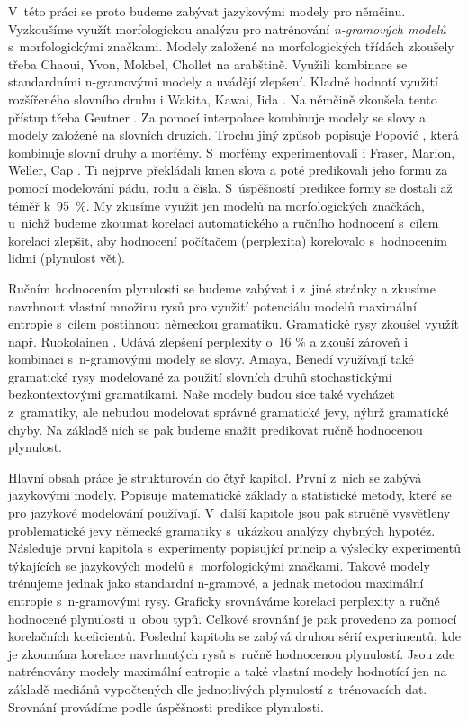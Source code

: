 \documentclass[12pt,a4paper]{report}
\begin{document}
V~této práci se proto budeme zabývat jazykovými modely pro němčinu. Vyzkoušíme využít morfologickou analýzu pro natrénování \textit{n-gramových modelů} s~morfologickými značkami. Modely založené na morfologických třídách zkoušely třeba Chaoui, Yvon, Mokbel, Chollet \cite{ghaoui} na arabštině. Využili kombinace se standardními n-gramovými modely a uvádějí zlepšení. Kladně hodnotí využití rozšířeného slovního druhu i Wakita, Kawai, Iida \cite{wakita}. Na němčině zkoušela tento přístup třeba Geutner \cite{geutner}. Za pomocí interpolace kombinuje modely se slovy a modely založené na slovních druzích. Trochu jiný způsob popisuje Popović \cite{popovic}, která kombinuje slovní druhy a morfémy. S~morfémy experimentovali i Fraser, Marion, Weller, Cap \cite{fraser12}. Ti nejprve překládali kmen slova a poté predikovali jeho formu za pomocí modelování pádu, rodu a čísla. S~úspěšností predikce formy se dostali až téměř k~95~\%. My zkusíme využít jen modelů na morfologických značkách, u~nichž budeme zkoumat korelaci automatického a ručního hodnocení s~cílem korelaci zlepšit, aby hodnocení počítačem (perplexita) korelovalo s~hodnocením lidmi (plynulost vět).

Ručním hodnocením plynulosti se budeme zabývat i z~jiné stránky a zkusíme navrhnout vlastní množinu rysů pro využití potenciálu modelů maximální entropie s~cílem postihnout německou gramatiku. Gramatické rysy zkoušel využít např. Ruokolainen \cite{ruokolainen}. Udává zlepšení perplexity o~16 \% a zkouší zároveň i kombinaci s~n-gramovými modely se slovy. Amaya, Benedí \cite{amaya} využívají také gramatické rysy modelované za použití slovních druhů stochastickými bezkontextovými gramatikami. Naše modely budou sice také vycházet z~gramatiky, ale nebudou modelovat správné gramatické jevy, nýbrž gramatické chyby. Na základě nich se pak budeme snažit predikovat ručně hodnocenou plynulost.

Hlavní obsah práce je strukturován do čtyř kapitol. První z~nich se zabývá jazykovými modely. Popisuje matematické základy a statistické metody, které se pro jazykové modelování používají. V~další kapitole jsou pak stručně vysvětleny problematické jevy německé gramatiky s~ukázkou analýzy chybných hypotéz. Následuje první kapitola s~experimenty popisující princip a výsledky experimentů týkajících se jazykových modelů s~morfologickými značkami. Takové modely trénujeme jednak jako standardní n-gramové, a jednak metodou maximální entropie s~n-gramovými rysy. Graficky srovnáváme korelaci perplexity a ručně hodnocené plynulosti u~obou typů. Celkové srovnání je pak provedeno za pomocí korelačních koeficientů. Poslední kapitola se zabývá druhou sérií experimentů, kde je zkoumána korelace navrhnutých rysů s~ručně hodnocenou plynulostí. Jsou zde natrénovány modely maximální entropie a také vlastní modely hodnotící jen na základě mediánů vypočtených dle jednotlivých plynulostí z~trénovacích dat. Srovnání provádíme podle úspěšnosti predikce plynulosti.
\end{document}

